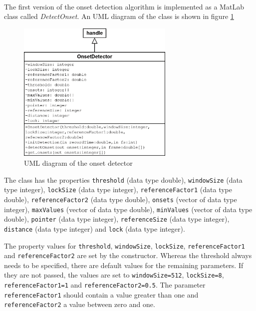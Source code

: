 The first version of the onset detection algorithm is implemented as a MatLab\textsuperscript{\textregistered} class called \textit{DetectOnset}. An UML diagram of the class is shown in figure \ref{fig:onsetDetectorUML}

\begin{figure}[htb]
	\centering
	\includegraphics[width=7.5cm]{images/UML/onsetDetectorUML.png}
	\caption{UML diagram of the onset detector}
	\label{fig:onsetDetectorUML}
\end{figure}

The class has the properties \lstinline{threshold} (data type double), \lstinline{windowSize} (data type integer), \lstinline{lockSize} (data type integer), \lstinline{referenceFactor1} (data type double), \lstinline{referenceFactor2} (data type double), \lstinline{onsets} (vector of data type integer), \lstinline{maxValues} (vector of data type double), \lstinline{minValues} (vector of data type double), \lstinline{pointer} (data type integer), \lstinline{referenceSize} (data type integer), \lstinline{distance} (data type integer) and \lstinline{lock} (data type integer).

\begin{sloppypar}
The property values for \lstinline{threshold}, \lstinline{windowSize},  \lstinline{lockSize}, \lstinline{referenceFactor1} and \lstinline{referenceFactor2} are set by the constructor. Whereas the threshold always needs to be specified, there are default values for the remaining parameters. If they are not passed, the values are set to \lstinline{windowSize=512}, \lstinline{lockSize=8}, \lstinline{referenceFactor1=1} and \lstinline{referenceFactor2=0.5}. The parameter \lstinline{referenceFactor1} should contain a value greater than one and \lstinline{referenceFactor2} a value between zero and one.
\end{sloppypar}

